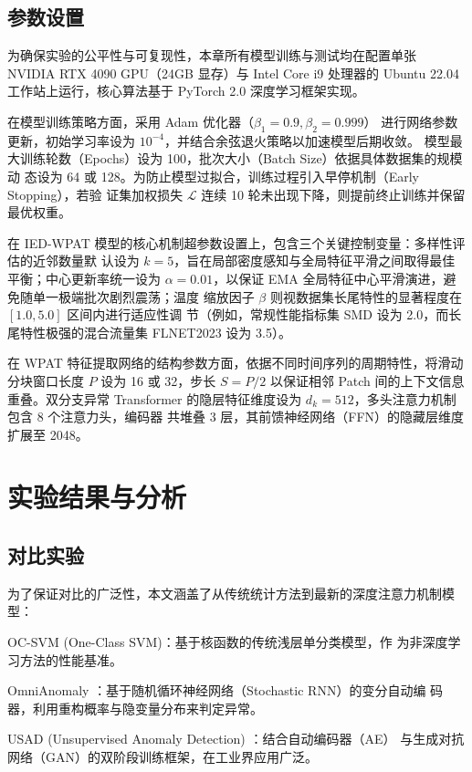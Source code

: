 \subsection{参数设置}
为确保实验的公平性与可复现性，本章所有模型训练与测试均在配置单张 NVIDIA 
RTX 4090 GPU（24GB 显存）与 Intel Core i9 处理器的 Ubuntu 22.04 
工作站上运行，核心算法基于 PyTorch 2.0 深度学习框架实现。

在模型训练策略方面，采用 Adam 优化器（$\beta_1=0.9, \beta_2=0.999$）
进行网络参数更新，初始学习率设为 $10^{-4}$，并结合余弦退火策略以加速模型后期收敛。
模型最大训练轮数（Epochs）设为 100，批次大小（Batch Size）依据具体数据集的规模动
态设为 64 或 128。为防止模型过拟合，训练过程引入早停机制（Early Stopping），若验
证集加权损失 $\mathcal{L}$ 连续 10 轮未出现下降，则提前终止训练并保留最优权重。

在 IED-WPAT 模型的核心机制超参数设置上，包含三个关键控制变量：多样性评估的近邻数量默
认设为 $k=5$，旨在局部密度感知与全局特征平滑之间取得最佳平衡；中心更新率统一设为 
$\alpha=0.01$，以保证 EMA 全局特征中心平滑演进，避免随单一极端批次剧烈震荡；温度
缩放因子 $\beta$ 则视数据集长尾特性的显著程度在 $[1.0, 5.0]$ 区间内进行适应性调
节（例如，常规性能指标集 SMD 设为 2.0，而长尾特性极强的混合流量集 FLNET2023 设为 3.5）。

在 WPAT 特征提取网络的结构参数方面，依据不同时间序列的周期特性，将滑动分块窗口长度 
$P$ 设为 16 或 32，步长 $S=P/2$ 以保证相邻 Patch 间的上下文信息重叠。双分支异常
Transformer 的隐层特征维度设为 $d_k=512$，多头注意力机制包含 8 个注意力头，编码器
共堆叠 3 层，其前馈神经网络（FFN）的隐藏层维度扩展至 2048。


\section{实验结果与分析}
\subsection{对比实验}

为了保证对比的广泛性，本文涵盖了从传统统计方法到最新的深度注意力机制模型：

OC-SVM (One-Class SVM)\cite{bountzis2025deep}：基于核函数的传统浅层单分类模型，作
为非深度学习方法的性能基准。

OmniAnomaly \cite{SHI2023110725}：基于随机循环神经网络（Stochastic RNN）的变分自动编
码器，利用重构概率与隐变量分布来判定异常。

USAD (Unsupervised Anomaly Detection) \cite{audibert2020usad}：结合自动编码器（AE）
与生成对抗网络（GAN）的双阶段训练框架，在工业界应用广泛。

